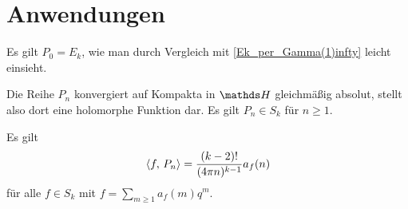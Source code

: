 \section{Anwendungen}

\begin{beme}
Es gilt $P_0 = E_k$, wie man durch Vergleich mit \autoref{Ek_per_Gamma(1)infty} leicht einsieht.
\end{beme}

\begin{satz-list}\label{<f,Pn>}
\item Die Reihe $P_n$ konvergiert auf Kompakta in $\HH$ gleichmäßig absolut, stellt also dort eine holomorphe Funktion dar. Es gilt $P_n \in S_k$ für $n \geq 1$.
\item Es gilt 
\[
	\scalarprd {f}{P_n} = \frac{(k-2)!}{(4\pi n)^{k-1}} a_f(n)
\]
für alle $f \in S_k$ mit $f = \sum_{m\geq 1} a_f(m) q^m$.
\end{satz-list}

